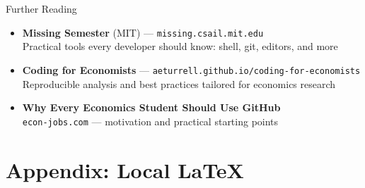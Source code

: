 \documentclass[13pt, aspectratio=169]{beamer}
\begin{document}
\begin{frame}{Further Reading}
    \begin{itemize}
        \item \textbf{Missing Semester} (MIT) — \texttt{missing.csail.mit.edu} \\
        Practical tools every developer should know: shell, git, editors, and more
        \vspace{0.3em}
        \item \textbf{Coding for Economists} — \texttt{aeturrell.github.io/coding-for-economists} \\
        Reproducible analysis and best practices tailored for economics research
        \vspace{0.3em}
        \item \textbf{Why Every Economics Student Should Use GitHub} \\
        \texttt{econ-jobs.com} — motivation and practical starting points
    \end{itemize}
    
\end{frame}


\appendix

\section{Appendix: Local \LaTeX}
\end{document}
